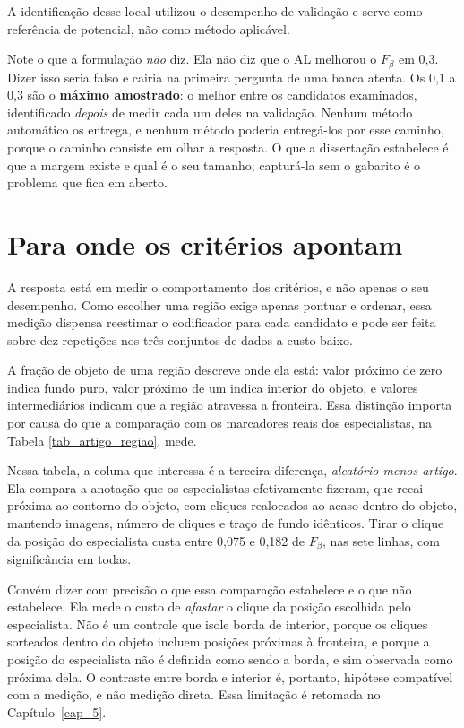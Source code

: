 A identificação desse local utilizou o desempenho de validação e serve como referência de potencial, não como método aplicável.

Note o que a formulação \emph{não} diz. Ela não diz que o \ac{AL} melhorou o $F_\beta$ em 0,3. Dizer isso seria falso e cairia na primeira pergunta de uma banca atenta. Os 0,1 a 0,3 são o \textbf{máximo amostrado}: o melhor entre os candidatos examinados, identificado \emph{depois} de medir cada um deles na validação. Nenhum método automático os entrega, e nenhum método poderia entregá-los por esse caminho, porque o caminho consiste em olhar a resposta. O que a dissertação estabelece é que a margem existe e qual é o seu tamanho; capturá-la sem o gabarito é o problema que fica em aberto.

\section{Para onde os critérios apontam}

A resposta está em medir o comportamento dos critérios, e não apenas o seu desempenho. Como escolher uma região exige apenas pontuar e ordenar, essa medição dispensa reestimar o codificador para cada candidato e pode ser feita sobre dez repetições nos três conjuntos de dados a custo baixo.

A fração de objeto de uma região descreve onde ela está: valor próximo de zero indica fundo puro, valor próximo de um indica interior do objeto, e valores intermediários indicam que a região atravessa a fronteira. Essa distinção importa por causa do que a comparação com os marcadores reais dos especialistas, na Tabela \ref{tab_artigo_regiao}, mede.

Nessa tabela, a coluna que interessa é a terceira diferença, \emph{aleatório menos artigo}. Ela compara a anotação que os especialistas efetivamente fizeram, que recai próxima ao contorno do objeto, com cliques realocados ao acaso dentro do objeto, mantendo imagens, número de cliques e traço de fundo idênticos. Tirar o clique da posição do especialista custa entre 0,075 e 0,182 de $F_\beta$, nas sete linhas, com significância em todas.

Convém dizer com precisão o que essa comparação estabelece e o que não estabelece. Ela mede o custo de \emph{afastar} o clique da posição escolhida pelo especialista. Não é um controle que isole borda de interior, porque os cliques sorteados dentro do objeto incluem posições próximas à fronteira, e porque a posição do especialista não é definida como sendo a borda, e sim observada como próxima dela. O contraste entre borda e interior é, portanto, hipótese compatível com a medição, e não medição direta. Essa limitação é retomada no Capítulo~\ref{cap_5}.

